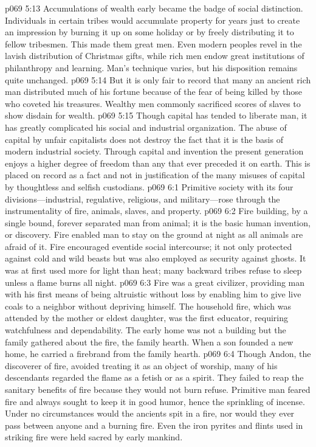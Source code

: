 \vs p069 5:13 Accumulations of wealth early became the badge of social distinction. Individuals in certain tribes would accumulate property for years just to create an impression by burning it up on some holiday or by freely distributing it to fellow tribesmen. This made them great men. Even modern peoples revel in the lavish distribution of Christmas gifts, while rich men endow great institutions of philanthropy and learning. Man’s technique varies, but his disposition remains quite unchanged.
\vs p069 5:14 But it is only fair to record that many an ancient rich man distributed much of his fortune because of the fear of being killed by those who coveted his treasures. Wealthy men commonly sacrificed scores of slaves to show disdain for wealth.
\vs p069 5:15 Though capital has tended to liberate man, it has greatly complicated his social and industrial organization. The abuse of capital by unfair capitalists does not destroy the fact that it is the basis of modern industrial society. Through capital and invention the present generation enjoys a higher degree of freedom than any that ever preceded it on earth. This is placed on record as a fact and not in justification of the many misuses of capital by thoughtless and selfish custodians.
\vs p069 6:1 Primitive society with its four divisions---industrial, regulative, religious, and mili\-tary---rose through the instrumentality of fire, animals, slaves, and property.
\vs p069 6:2 Fire building, by a single bound, forever separated man from animal; it is the basic human invention, or discovery. Fire enabled man to stay on the ground at night as all animals are afraid of it. Fire encouraged eventide social intercourse; it not only protected against cold and wild beasts but was also employed as security against ghosts. It was at first used more for light than heat; many backward tribes refuse to sleep unless a flame burns all night.
\vs p069 6:3 Fire was a great civilizer, providing man with his first means of being altruistic without loss by enabling him to give live coals to a neighbor without depriving himself. The household fire, which was attended by the mother or eldest daughter, was the first educator, requiring watchfulness and dependability. The early home was not a building but the family gathered about the fire, the family hearth. When a son founded a new home, he carried a firebrand from the family hearth.
\pc \vs p069 6:4 Though Andon, the discoverer of fire, avoided treating it as an object of worship, many of his descendants regarded the flame as a fetish or as a spirit. They failed to reap the sanitary benefits of fire because they would not burn refuse. Primitive man feared fire and always sought to keep it in good humor, hence the sprinkling of incense. Under no circumstances would the ancients spit in a fire, nor would they ever pass between anyone and a burning fire. Even the iron pyrites and flints used in striking fire were held sacred by early mankind.
